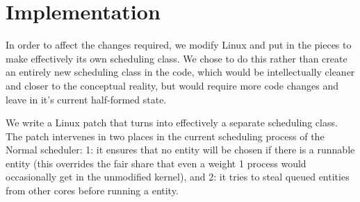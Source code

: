 \section{Implementation}\label{s:implementation}


In order to affect the changes required, we modify Linux and put in the pieces
to make \schedidle{} effectively its own scheduling class. We chose to do this
rather than create an entirely new scheduling class in the code, which would be
intellectually cleaner and closer to the conceptual reality, but would require
more code changes and leave \schedidle{} in it's current half-formed
state.

We write a Linux patch that turns \schedidle{} into effectively a separate
scheduling class. The patch intervenes in two places in the current scheduling
process of the Normal scheduler: 1: it ensures that no \schedidle{} entity will
be chosen if there is a runnable \schednormal{} entity (this overrides the fair
share that even a weight 1 process would occasionally get in the unmodified
kernel), and 2: it tries to steal queued \schednormal{} entities from other
cores before running a \schedidle{} entity.